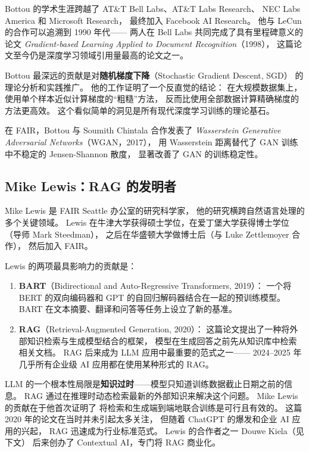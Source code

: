 Bottou 的学术生涯跨越了 AT\&T Bell Labs、AT\&T Labs Research、
NEC Labs America 和 Microsoft Research，
最终加入 Facebook AI Research。
他与 LeCun 的合作可以追溯到 1990 年代——
两人在 Bell Labs 共同完成了具有里程碑意义的论文
\textit{Gradient-based Learning Applied to Document Recognition}（1998），
这篇论文至今仍是深度学习领域引用量最高的论文之一。

Bottou 最深远的贡献是对\textbf{随机梯度下降}（Stochastic Gradient Descent, SGD）
的理论分析和实践推广。
他的工作证明了一个反直觉的结论：
在大规模数据集上，使用单个样本近似计算梯度的``粗糙''方法，
反而比使用全部数据计算精确梯度的方法更高效。
这个看似简单的洞见是所有现代深度学习训练的理论基石。

在 FAIR，Bottou 与 Soumith Chintala 合作发表了
\textit{Wasserstein Generative Adversarial Networks}（WGAN，2017），
用 Wasserstein 距离替代了 GAN 训练中不稳定的 Jensen-Shannon 散度，
显著改善了 GAN 的训练稳定性。

\subsection{Mike Lewis：RAG 的发明者}

Mike Lewis 是 FAIR Seattle 办公室的研究科学家，
他的研究横跨自然语言处理的多个关键领域。
Lewis 在牛津大学获得硕士学位，在爱丁堡大学获得博士学位（导师 Mark Steedman），
之后在华盛顿大学做博士后（与 Luke Zettlemoyer 合作），
然后加入 FAIR。

Lewis 的两项最具影响力的贡献是：

\begin{enumerate}
  \item \textbf{BART}（Bidirectional and Auto-Regressive Transformers, 2019）：
    一个将 BERT 的双向编码器和 GPT 的自回归解码器结合在一起的预训练模型。
    BART 在文本摘要、翻译和问答等任务上设立了新的基准。
  \item \textbf{RAG}（Retrieval-Augmented Generation, 2020）：
    这篇论文提出了一种将外部知识检索与生成模型结合的框架，
    模型在生成回答之前先从知识库中检索相关文档。
    RAG 后来成为 LLM 应用中最重要的范式之一——
    2024--2025 年几乎所有企业级 AI 应用都在使用某种形式的 RAG。
\end{enumerate}

\begin{corebox}
LLM 的一个根本性局限是\textbf{知识过时}——模型只知道训练数据截止日期之前的信息。
RAG 通过在推理时动态检索最新的外部知识来解决这个问题。
Mike Lewis 的贡献在于他首次证明了
将检索和生成端到端地联合训练是可行且有效的。
这篇 2020 年的论文在当时并未引起太多关注，
但随着 ChatGPT 的爆发和企业 AI 应用的兴起，
RAG 迅速成为行业标准范式。
Lewis 的合作者之一 Douwe Kiela（见下文）
后来创办了 Contextual AI，专门将 RAG 商业化。
\end{corebox}

